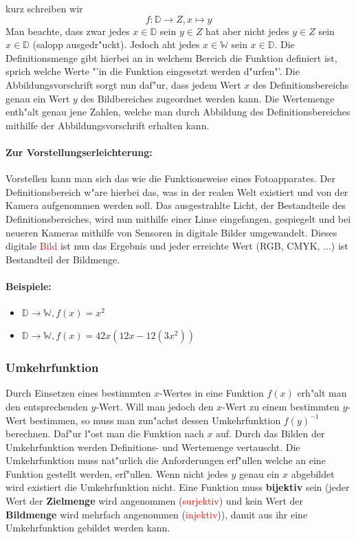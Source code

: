 \begin{flushleft}
kurz schreiben wir
\begin{equation*}
f : \mathbb{D} \to Z, x \mapsto y
\end{equation*}
Man beachte, dass zwar jedes $x \in \mathbb{D}$ sein $y \in Z$ hat aber nicht jedes $y \in Z$ sein $x \in \mathbb{D}$ (salopp ausgedr"uckt). Jedoch aht jedes $x \in \mathbb{W}$ sein $x \in \mathbb{D}$. Die Definitionsmenge gibt hierbei an in welchem Bereich die Funktion definiert ist, sprich welche Werte "'in die Funktion eingesetzt werden d"urfen"'. Die Abbildungsvorschrift sorgt nun daf"ur, dass jedem Wert $x$ des Definitionsbereichs genau ein Wert $y$ des Bildbereiches zugeordnet werden kann. Die Wertemenge enth"alt genau jene Zahlen, welche man durch Abbildung des Definitionsbereiches mithilfe der Abbildungsvorschrift erhalten kann.

\paragraph{Zur Vorstellungserleichterung:}
Vorstellen kann man sich das wie die Funktionsweise eines Fotoapparates. Der Definitionsbereich w"are hierbei das, was in der realen Welt existiert und von der Kamera aufgenommen werden soll. Das ausgestrahlte Licht, der Bestandteile des Definitionsbereiches, wird nun mithilfe einer Linse eingefangen, gespiegelt und bei neueren Kameras mithilfe von Sensoren in digitale Bilder umgewandelt. Dieses digitale \textcolor{red}{Bild} ist nun das Ergebnis und jeder erreichte Wert (RGB, CMYK, ...) ist Bestandteil der Bildmenge.

\paragraph{Beispiele:}
\begin{itemize}
\item $\mathbb{D}\rightarrow\mathbb{W}, f(x)=x^2$
\item $\mathbb{D}\rightarrow\mathbb{W}, f(x)=42x(12x-12(3x^2))$
\end{itemize}
\end{flushleft}

\subsubsection{Umkehrfunktion}
Durch Einsetzen eines bestimmten $x$-Wertes in eine Funktion $f(x)$ erh"alt man den entsprechenden $y$-Wert. Will man jedoch den $x$-Wert zu einem bestimmten $y$-Wert bestimmen, so muss man zun"achst dessen Umkehrfunktion $f(y)^{-1}$ berechnen. Daf"ur l"ost man die Funktion nach $x$ auf. Durch das Bilden der Umkehrfunktion werden Definitions- und Wertemenge vertauscht. Die Umkehrfunktion muss nat"urlich die Anforderungen erf"ullen welche an eine Funktion gestellt werden, erf"ullen. Wenn nicht jedes $y$ genau ein $x$ abgebildet wird existiert die Umkehrfunktion nicht. Eine Funktion muss \textbf{bijektiv} sein (jeder Wert der \textbf{Zielmenge} wird angenommen (\textcolor{red}{surjektiv}) und kein Wert der \textbf{Bildmenge} wird mehrfach angenommen (\textcolor{red}{injektiv})), damit aus ihr eine Umkehrfunktion gebildet werden kann.


